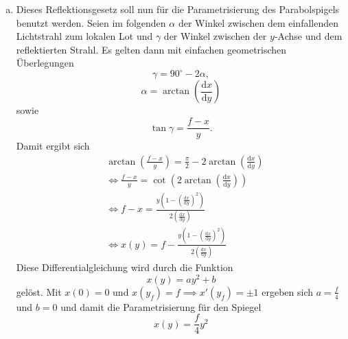 \begin{enumerate}[(a)]
\item Dieses Reflektionsgesetz soll nun für die Parametrisierung des Parabolspigels benutzt werden. Seien im folgenden $\alpha$ der Winkel zwischen dem einfallenden Lichtstrahl zum lokalen Lot und $\gamma$ der Winkel zwischen der $y$-Achse und dem reflektierten Strahl.
Es gelten dann mit einfachen geometrischen Überlegungen
\begin{equation}
  \gamma=90^{\circ}-2\alpha,
\end{equation}
\begin{equation}
  \alpha = \arctan\left(\frac{\mathrm{d}x}{\mathrm{d}y}\right)
\end{equation}
sowie 
\begin{equation}
  \tan \gamma=\frac{f-x}{y}.
\end{equation}
Damit ergibt sich 
\begin{align}
  &\arctan\left(\frac{f-x}{y}\right)=\frac{\pi}{2}-2\arctan\left(\frac{\mathrm{d}x}{\mathrm{d}y}\right)\\
  &\iff \frac{f-x}{y}=\cot\left(2\arctan\left(\frac{\mathrm{d}x}{\mathrm{d}y}\right)\right)\\
  &\iff f-x=\frac{y\left(1-\left(\frac{\mathrm{d}x}{\mathrm{d}y}\right)^2\right)}{2\left(\frac{\mathrm{d}x}{\mathrm{d}y}\right)}\\
  &\iff x(y)=f-\frac{y\left(1-\left(\frac{\mathrm{d}x}{\mathrm{d}y}\right)^2\right)}{2\left(\frac{\mathrm{d}x}{\mathrm{d}y}\right)}
\end{align}
Diese Differentialgleichung wird durch die Funktion
\begin{equation}
  x(y)=ay^2+b
\end{equation}
gelöst. Mit $x(0)=0$ und $x(y_f)=f\implies x'(y_f)=\pm1$ ergeben sich $a=\frac{f}{4}$ und $b=0$ und damit die Parametrisierung für den Spiegel
\begin{equation}
  x(y)=\frac{f}{4}y^2
\end{equation}

\end{enumerate}